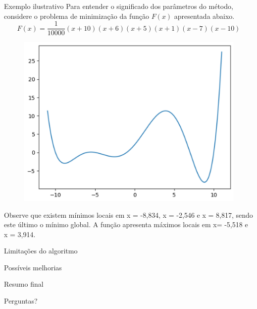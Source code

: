 \documentclass{beamer}
\begin{document}
\begin{frame}{Exemplo ilustrativo}
    Para entender o significado dos parâmetros do método, considere o problema de
minimização da função $F(x)$ apresentada abaixo.
    \begin{equation}
        F(x) = \frac{1}{10000}(x+10)(x+6)(x+5)(x+1)(x-7)(x-10)
    \end{equation}
    \begin{figure}
        \includegraphics[scale = 0.35]{src/PontoOtimo2.png}
    \end{figure}

Observe que existem mínimos locais em x = -8,834, x = -2,546 e x = 8,817, sendo este
último o mínimo global. A função apresenta máximos locais em x= -5,518 e x = 3,914.
\end{frame}

\begin{frame}{Limitações do algoritmo}
    
\end{frame}

\begin{frame}{Possíveis melhorias}
    
\end{frame}

\begin{frame}{Resumo final}
    
\end{frame}

\begin{frame}
    \begin{center}
        \centering
        \Large{Perguntas?}
    \end{center}
\end{frame}
\end{document}
